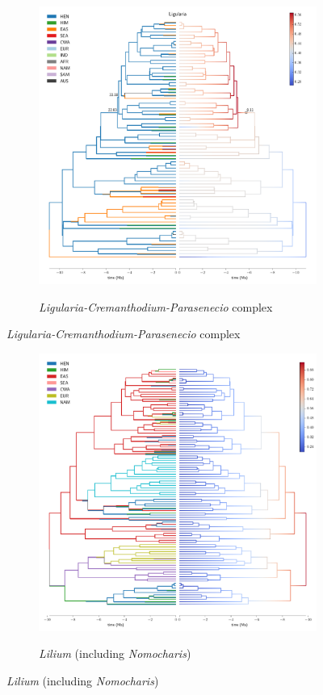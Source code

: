 \begin{figure}
  \ContinuedFloat
\begin{subfigure}{\textwidth}
\centering
\includegraphics[width=.99\linewidth]{figures/Ligularia-supfig.pdf}
\label{fig:allium}
\caption{\textit{Ligularia-Cremanthodium-Parasenecio} complex}
\end{subfigure}
\end{figure}

\begin{figure}
  \ContinuedFloat
\begin{subfigure}{\textwidth}
\centering
\includegraphics[width=.99\linewidth]{figures/Lilium-supfig.pdf}
\label{fig:allium}
\caption{\textit{Lilium} (including \textit{Nomocharis})}
\end{subfigure}
\end{figure}

